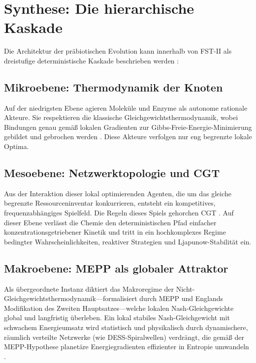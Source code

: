 \documentclass[12pt,a4paper]{article}
\theoremstyle{remark}
\begin{document}
\section{Synthese: Die hierarchische Kaskade}
\label{sec:synthesis}

Die Architektur der pr\"abiotischen Evolution kann innerhalb von FST-II als dreistufige deterministische Kaskade beschrieben werden \citep{ThermodynamicsLife}:

\subsection{Mikroebene: Thermodynamik der Knoten}

Auf der niedrigsten Ebene agieren Molek\"ule und Enzyme als autonome rationale Akteure. Sie respektieren die klassische Gleichgewichtsthermodynamik, wobei Bindungen genau gem\"a\ss{} lokalen Gradienten zur Gibbs-Freie-Energie-Minimierung gebildet und gebrochen werden \citep{MetabolicNash}. Diese Akteure verfolgen nur eng begrenzte lokale Optima.

\subsection{Mesoebene: Netzwerktopologie und CGT}

Aus der Interaktion dieser lokal optimierenden Agenten, die um das gleiche begrenzte Ressourceninventar konkurrieren, entsteht ein kompetitives, frequenzabh\"angiges Spielfeld. Die Regeln dieses Spiels gehorchen CGT \citep{AzoarcusPNAS}. Auf dieser Ebene verl\"asst die Chemie den deterministischen Pfad einfacher konzentrationsgetriebener Kinetik und tritt in ein hochkomplexes Regime bedingter Wahrscheinlichkeiten, reaktiver Strategien und Ljapunow-Stabilit\"at ein.

\subsection{Makroebene: MEPP als globaler Attraktor}

Als \"ubergeordnete Instanz diktiert das Makroregime der Nicht-Gleichgewichtsthermodynamik---formalisiert durch MEPP und Englands Modifikation des Zweiten Hauptsatzes---welche lokalen Nash-Gleichgewichte global und langfristig \"uberleben. Ein lokal stabiles Nash-Gleichgewicht mit schwachem Energieumsatz wird statistisch und physikalisch durch dynamischere, r\"aumlich verteilte Netzwerke (wie DESS-Spiralwellen) verdr\"angt, die gem\"a\ss{} der MEPP-Hypothese planet\"are Energiegradienten effizienter in Entropie umwandeln \citep{EntropyMEPP}.
\end{document}
